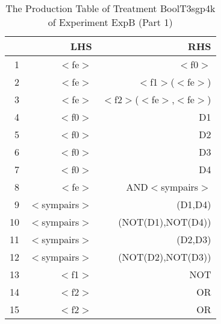 \begin{table}[ht]
\centering
\begin{tabular}{rrr}
  \hline
 & LHS & RHS \\ 
  \hline
1 & $<$fe$>$ & $<$f0$>$ \\ 
  2 & $<$fe$>$ & $<$f1$>$($<$fe$>$) \\ 
  3 & $<$fe$>$ & $<$f2$>$($<$fe$>$,$<$fe$>$) \\ 
  4 & $<$f0$>$ & D1 \\ 
  5 & $<$f0$>$ & D2 \\ 
  6 & $<$f0$>$ & D3 \\ 
  7 & $<$f0$>$ & D4 \\ 
  8 & $<$fe$>$ & AND$<$sympairs$>$ \\ 
  9 & $<$sympairs$>$ & (D1,D4) \\ 
  10 & $<$sympairs$>$ & (NOT(D1),NOT(D4)) \\ 
  11 & $<$sympairs$>$ & (D2,D3) \\ 
  12 & $<$sympairs$>$ & (NOT(D2),NOT(D3)) \\ 
  13 & $<$f1$>$ & NOT \\ 
  14 & $<$f2$>$ & OR \\ 
  15 & $<$f2$>$ & OR \\ 
   \hline
\end{tabular}
\caption{The Production Table of Treatment BoolT3sgp4k of Experiment ExpB (Part 1)} 
\end{table}
